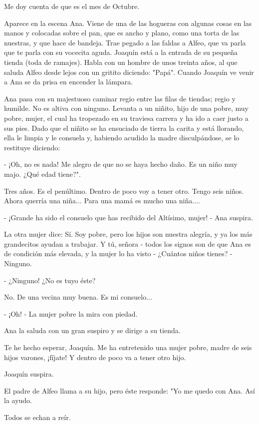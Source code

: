 \documentclass[12pt]{book} %
\begin{document}
Me doy cuenta de que es el mes de Octubre. 

Aparece en la escena Ana. Viene de una de las hogueras con algunas cosas en las manos y colocadas sobre el pan, que es ancho y plano, como una torta de las nuestras, y que hace de bandeja. Trae pegado a las faldas a Alfeo, que va parla que te parla con su vocecita aguda. Joaquín está a la entrada de su pequeña tienda (toda de ramajes). Habla con un hombre de unos treinta años, al que saluda Alfeo desde lejos con un gritito diciendo: "Papá". Cuando Joaquín ve venir a Ana se da prisa en encender la lámpara. 

Ana pasa con su majestuoso caminar regio entre las filas de tiendas; regio y humilde. No es altiva con ninguno. Levanta a un niñito, hijo de una pobre, muy pobre, mujer, el cual ha tropezado en su traviesa carrera y ha ido a caer justo a sus pies. Dado que el niñito se ha ensuciado de tierra la carita y está llorando, ella le limpia y le consuela y, habiendo acudido la madre disculpándose, se lo restituye diciendo: 

- ¡Oh, no es nada! Me alegro de que no se haya hecho daño. Es un niño muy majo. ¿Qué edad tiene?". 

Tres años. Es el penúltimo. Dentro de poco voy a tener otro. Tengo seis niños. Ahora querría una niña... Para una mamá es mucho una niña.... 

- ¡Grande ha sido el consuelo que has recibido del Altísimo, mujer! - Ana suspira. 

La otra mujer dice: Sí. Soy pobre, pero los hijos son nuestra alegría, y ya los más grandecitos ayudan a trabajar. Y tú, señora - todos los signos son de que Ana es de condición más elevada, y la mujer lo ha visto - ¿Cuántos niños tienes? - Ninguno. 

- ¿Ninguno! ¿No es tuyo éste? 

No. De una vecina muy buena. Es mi consuelo... 

 - ¡Oh! - La mujer pobre la mira con piedad. 

Ana la saluda con un gran suspiro y se dirige a su tienda. 

Te he hecho esperar, Joaquín. Me ha entretenido una mujer pobre, madre de seis hijos varones, ¡fíjate! Y dentro de poco va a tener otro hijo. 

Joaquín suspira. 

El padre de Alfeo llama a su hijo, pero éste responde: "Yo me quedo con Ana. Así la ayudo. 

Todos se echan a reír. 
\end{document}
